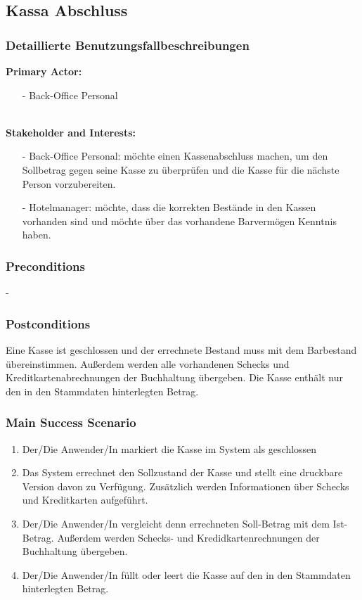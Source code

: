 \documentclass[./detailed_overview_usecases.tex]{subfiles}
\begin{document}
    \subsection{Kassa Abschluss}
    \subsubsection{Detaillierte Benutzungsfallbeschreibungen}
    \textbf{Primary Actor:}
    \begin{itemize}
        \item [-] Back-Office Personal
    \end{itemize}
    \\
    \textbf{Stakeholder and Interests:}
    \begin{itemize}
        \item[-] Back-Office Personal: möchte einen Kassenabschluss
        machen, um den Sollbetrag gegen seine Kasse zu überprüfen und die Kasse für
        die nächste Person vorzubereiten.
        \item[-] Hotelmanager: möchte, dass die korrekten Bestände in
        den Kassen vorhanden sind und möchte über das vorhandene Barvermögen
        Kenntnis haben.
    \end{itemize}

    \subsubsection*{Preconditions}
     -

    \subsubsection*{Postconditions}
    Eine Kasse ist geschlossen und der errechnete Bestand muss mit dem
    Barbestand übereinstimmen. Außerdem werden alle vorhandenen Schecks und
    Kreditkartenabrechnungen der Buchhaltung übergeben.
    Die Kasse enthält nur den in den Stammdaten hinterlegten Betrag.

    \subsubsection*{Main Success Scenario}
    \begin{enumerate}
        \item Der/Die Anwender/In markiert die Kasse im System als geschlossen
        \item Das System errechnet den Sollzustand der Kasse und stellt eine druckbare
        Version davon zu Verfügung. Zusätzlich werden Informationen über Schecks und Kreditkarten
        aufgeführt.
        \item Der/Die Anwender/In vergleicht denn errechneten Soll-Betrag mit dem
        Ist-Betrag. Außerdem werden Schecks- und Kredidkartenrechnungen der Buchhaltung übergeben.
        \item Der/Die Anwender/In füllt oder leert die Kasse auf den in den Stammdaten hinterlegten Betrag.
    \end{enumerate}
\end{document}
